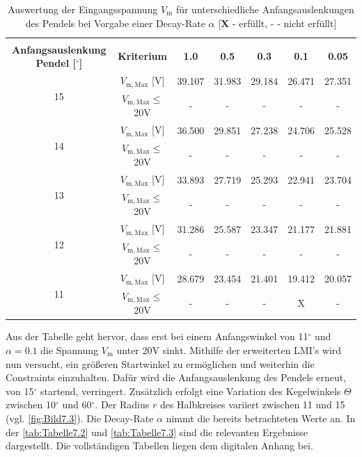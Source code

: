 \renewcommand{\arraystretch}{1.2}
\begin{table}[H]
    \centering
    \begin{tabular}{|c|c|c|c|c|c|c|}
        \hline
        & & \multicolumn{5}{c|}{ \boldmath{$\alpha$} } \\
        \makecell{\textbf{Anfangsauslenkung} \\ \textbf{Pendel [$^\circ$]}} & \textbf{Kriterium} & \textbf{1.0} & \textbf{0.5} & \textbf{0.3} & \textbf{0.1} & \textbf{0.05} \\
        \hline
        \multirow{2}{*}{15} & $V_{\mathrm{m,Max}}$ [V] & 39.107 & 31.983 & 29.184 & 26.471 & 27.351 \\
        & $V_{\mathrm{m,Max}} \leq$ 20V & - & - & - & - & -\\
        \hline
        \multirow{2}{*}{14} & $V_{\mathrm{m,Max}}$ [V] & 36.500 & 29.851 & 27.238 & 24.706 & 25.528 \\
        & $V_{\mathrm{m,Max}} \leq$ 20V & - & - & - & - & -\\
        \hline
        \multirow{2}{*}{13} & $V_{\mathrm{m,Max}}$ [V] & 33.893 & 27.719 & 25.293 & 22.941 & 23.704 \\
        & $V_{\mathrm{m,Max}} \leq$ 20V & - & - & - & - & -\\
        \hline
        \multirow{2}{*}{12} & $V_{\mathrm{m,Max}}$ [V] & 31.286 & 25.587 & 23.347 & 21.177 & 21.881 \\
        & $V_{\mathrm{m,Max}} \leq$ 20V & - & - & - & - & -\\
        \hline
        \multirow{2}{*}{11} & $V_{\mathrm{m,Max}}$ [V] & 28.679 & 23.454 & 21.401 & 19.412 & 20.057 \\
        & $V_{\mathrm{m,Max}} \leq$ 20V & - & - & - & X & -\\
        \hline
    \end{tabular}
    \caption[Auswertung von $V_{\mathrm{m}}$ für unterschiedliche Anfangsauslenkungen]{Auswertung der Eingangsspannung $V_{\mathrm{m}}$ für unterschiedliche Anfangsauslenkungen des Pendels bei Vorgabe einer Decay-Rate $\alpha$ [$\textbf{X}$ - erfüllt, $\textbf{-}$ - nicht erfüllt]} 
    \label{tab:Tabelle7.1}
\end{table}
\renewcommand{\arraystretch}{1}

Aus der Tabelle geht hervor, dass erst bei einem Anfangswinkel von 11$^\circ$ und $\alpha = 0.1$ die Spannung $V_{\mathrm{m}}$ unter 20V sinkt. Mithilfe der erweiterten LMI's wird nun versucht, ein größeren Startwinkel zu ermöglichen und weiterhin die Constraints einzuhalten. Dafür wird die Anfangsauslenkung des Pendels erneut, von 15$^\circ$ startend, verringert. Zusätzlich erfolgt eine Variation des Kegelwinkels $\Theta$ zwischen 10$^\circ$ und 60$^\circ$. Der Radius $r$ des Halbkreises variiert zwischen 11 und 15 (vgl. \autoref{fig:Bild7.3}). Die Decay-Rate $\alpha$ nimmt die bereits betrachteten Werte an. In der \autoref{tab:Tabelle7.2} und \autoref{tab:Tabelle7.3} sind die relevanten Ergebnisse dargestellt. Die vollständigen Tabellen liegen dem digitalen Anhang bei.

